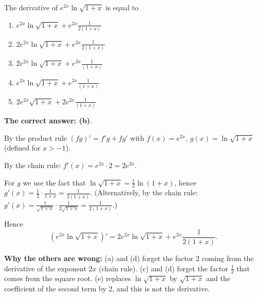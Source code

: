 
\begin{question}
The derivative of $e^{2x}\ln\sqrt{1+x}$ is equal to
\begin{enumerate}
  \item $e^{2x}\ln\sqrt{1+x}+e^{2x}\frac{1}{2(1+x)}$
  \item $2e^{2x}\ln\sqrt{1+x}+e^{2x}\frac{1}{2(1+x)}$
  \item $2e^{2x}\ln\sqrt{1+x}+e^{2x}\frac{1}{(1+x)}$
  \item $e^{2x}\ln\sqrt{1+x}+e^{2x}\frac{1}{(1+x)}$
  \item $2e^{2x}\sqrt{1+x}+2e^{2x}\frac{1}{(1+x)}$
\end{enumerate}
\end{question}

\begin{solution}
\textbf{The correct answer: (b)}.

By the product rule $(fg)'=f'g+fg'$ with $f(x)=e^{2x}$, $g(x)=\ln\sqrt{1+x}$ (defined for $x>-1$).

By the chain rule: $f'(x)=e^{2x}\cdot 2=2e^{2x}$.

For $g$ we use the fact that $\ln\sqrt{1+x}=\frac12\ln(1+x)$, hence $g'(x)=\frac12\cdot\frac{1}{1+x}=\frac{1}{2(1+x)}$.
(Alternatively, by the chain rule: $g'(x)=\frac{1}{\sqrt{1+x}}\cdot\frac{1}{2\sqrt{1+x}}=\frac{1}{2(1+x)}$.)

Hence
\[
\left(e^{2x}\ln\sqrt{1+x}\right)'=\boxed{2e^{2x}\ln\sqrt{1+x}+e^{2x}\frac{1}{2(1+x)}} .
\]

\textbf{Why the others are wrong:} (a) and (d) forget the factor 2 coming from the derivative of the exponent $2x$ (chain rule). (c) and (d) forget the factor $\frac12$ that comes from the square root. (e) replaces $\ln\sqrt{1+x}$ by $\sqrt{1+x}$ and the coefficient of the second term by 2, and this is not the derivative.
\end{solution}
